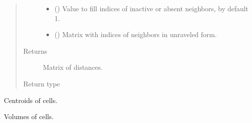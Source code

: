 \documentclass[letterpaper,10pt,english]{sphinxmanual}
\begin{document}
\begin{fulllineitems}
\begin{fulllineitems}
\begin{quote}
\begin{description}
\begin{itemize}
\item {} 
 (\sphinxstyleliteralemphasis{\sphinxupquote{, }}) \textendash{} Value to fill indices of inactive or absent neighbors, by default \sphinxhyphen{}1.

\item {} 
 (\sphinxstyleliteralemphasis{\sphinxupquote{, }}) \textendash{} Matrix with indices of neighbors in unraveled form.

\end{itemize}

\item[{Returns}] \leavevmode
Matrix of distances.

\item[{Return type}] \leavevmode
{}

\end{description}\end{quote}

\end{fulllineitems}


\begin{fulllineitems}
\label{\detokenize{api/grids:geology.src.Grid.cell_centroids}}
Centroids of cells.

\end{fulllineitems}


\begin{fulllineitems}
\label{\detokenize{api/grids:geology.src.Grid.cell_volumes}}
Volumes of cells.

\end{fulllineitems}


\end{fulllineitems}
\end{document}

